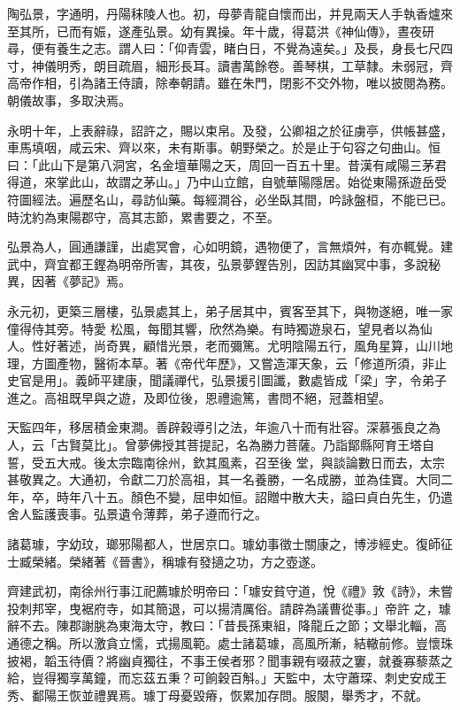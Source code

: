 \begin{pinyinscope}
 陶弘景，字通明，丹陽秣陵人也。初，母夢青龍自懷而出，并見兩天人手執香爐來至其所，已而有娠，遂產弘景。幼有異操。年十歲，得葛洪《神仙傳》，晝夜研尋，便有養生之志。謂人曰：「仰青雲，睹白日，不覺為遠矣。」及長，身長七尺四寸，神儀明秀，朗目疏眉，細形長耳。讀書萬餘卷。善琴棋，工草隸。未弱冠，齊高帝作相，引為諸王侍讀，除奉朝請。雖在朱門，閉影不交外物，唯以披閱為務。朝儀故事，多取決焉。



 永明十年，上表辭祿，詔許之，賜以束帛。及發，公卿祖之於征虜亭，供帳甚盛，車馬填咽，咸云宋、齊以來，未有斯事。朝野榮之。於是止于句容之句曲山。恒
 曰：「此山下是第八洞宮，名金壇華陽之天，周回一百五十里。昔漢有咸陽三茅君得道，來掌此山，故謂之茅山。」乃中山立館，自號華陽隱居。始從東陽孫遊岳受符圖經法。遍歷名山，尋訪仙藥。每經澗谷，必坐臥其間，吟詠盤桓，不能已已。時沈約為東陽郡守，高其志節，累書要之，不至。



 弘景為人，圓通謙謹，出處冥會，心如明鏡，遇物便了，言無煩舛，有亦輒覺。建武中，齊宜都王鏗為明帝所害，其夜，弘景夢鏗告別，因訪其幽冥中事，多說秘異，因著《夢記》焉。



 永元初，更築三層樓，弘景處其上，弟子居其中，賓客至其下，與物遂絕，唯一家僮得侍其旁。特愛
 松風，每聞其響，欣然為樂。有時獨遊泉石，望見者以為仙人。性好著述，尚奇異，顧惜光景，老而彌篤。尤明陰陽五行，風角星算，山川地理，方圖產物，醫術本草。著《帝代年歷》，又嘗造渾天象，云「修道所須，非止史官是用」。義師平建康，聞議禪代，弘景援引圖讖，數處皆成「梁」字，令弟子進之。高祖既早與之遊，及即位後，恩禮逾篤，書問不絕，冠蓋相望。



 天監四年，移居積金東澗。善辟穀導引之法，年逾八十而有壯容。深慕張良之為人，云「古賢莫比」。曾夢佛授其菩提記，名為勝力菩薩。乃詣鄮縣阿育王塔自誓，受五大戒。後太宗臨南徐州，欽其風素，召至後
 堂，與談論數日而去，太宗甚敬異之。大通初，令獻二刀於高祖，其一名養勝，一名成勝，並為佳寶。大同二年，卒，時年八十五。顏色不變，屈申如恒。詔贈中散大夫，謚曰貞白先生，仍遣舍人監護喪事。弘景遺令薄葬，弟子遵而行之。



 諸葛璩，字幼玟，瑯邪陽都人，世居京口。璩幼事徵士關康之，博涉經史。復師征士臧榮緒。榮緒著《晉書》，稱璩有發擿之功，方之壺遂。



 齊建武初，南徐州行事江祀薦璩於明帝曰：「璩安貧守道，悅《禮》敦《詩》，未嘗投刺邦宰，曳裾府寺，如其簡退，可以揚清厲俗。請辟為議曹從事。」帝許
 之，璩辭不去。陳郡謝朓為東海太守，教曰：「昔長孫東組，降龍丘之節；文舉北輜，高通德之稱。所以激貪立懦，式揚風範。處士諸葛璩，高風所漸，結轍前修。豈懷珠披褐，韜玉待價？將幽貞獨往，不事王侯者邪？聞事親有啜菽之窶，就養寡藜蒸之給，豈得獨享萬鐘，而忘茲五秉？可餉穀百斛。」天監中，太守蕭琛、刺史安成王秀、鄱陽王恢並禮異焉。璩丁母憂毀瘠，恢累加存問。服闋，舉秀才，不就。




\end{pinyinscope}
